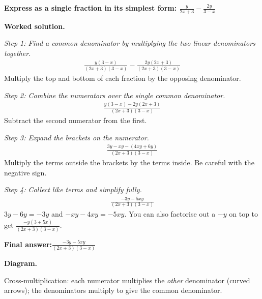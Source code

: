 \documentclass[11pt]{article}
\newcommand{\question}[1]{\par\medskip\noindent\textbf{#1}\par}
\begin{document}
\question{Express as a single fraction in its simplest form: \( \frac{y}{2x+3} - \frac{2y}{3-x} \)}

\textbf{Worked solution.}

\textit{Step 1: Find a common denominator by multiplying the two linear denominators together.}
\[\begin{gathered}
\frac{y(3-x)}{(2x+3)(3-x)} - \frac{2y(2x+3)}{(2x+3)(3-x)}
\end{gathered}\]
Multiply the top and bottom of each fraction by the opposing denominator.

\textit{Step 2: Combine the numerators over the single common denominator.}
\[\begin{gathered}
\frac{y(3-x) - 2y(2x+3)}{(2x+3)(3-x)}
\end{gathered}\]
Subtract the second numerator from the first.

\textit{Step 3: Expand the brackets on the numerator.}
\[\begin{gathered}
\frac{3y - xy - (4xy + 6y)}{(2x+3)(3-x)}
\end{gathered}\]
Multiply the terms outside the brackets by the terms inside. Be careful with the negative sign.

\textit{Step 4: Collect like terms and simplify fully.}
\[\begin{gathered}
\frac{-3y - 5xy}{(2x+3)(3-x)}
\end{gathered}\]
\( 3y - 6y = -3y \) and \( -xy - 4xy = -5xy \). You can also factorise out a \( -y \) on top to get \( \frac{-y(3+5x)}{(2x+3)(3-x)} \).

\begin{answerbox}
\textbf{Final answer:}\quad \(\displaystyle \frac{-3y - 5xy}{(2x+3)(3-x)}\)
\end{answerbox}
\textbf{Diagram.}

\begin{center}
\end{center}
\small Cross-multiplication: each numerator multiplies the \emph{other} denominator (curved arrows); the denominators multiply to give the common denominator.\normalsize
\end{document}
